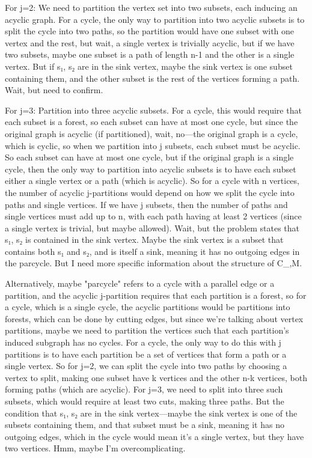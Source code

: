 For j=2: We need to partition the vertex set into two subsets, each inducing an acyclic graph. For a cycle, the only way to partition into two acyclic subsets is to split the cycle into two paths, so the partition would have one subset with one vertex and the rest, but wait, a single vertex is trivially acyclic, but if we have two subsets, maybe one subset is a path of length n-1 and the other is a single vertex. But if {s₁, s₂} are in the sink vertex, maybe the sink vertex is one subset containing them, and the other subset is the rest of the vertices forming a path. Wait, but need to confirm. 

For j=3: Partition into three acyclic subsets. For a cycle, this would require that each subset is a forest, so each subset can have at most one cycle, but since the original graph is acyclic (if partitioned), wait, no—the original graph is a cycle, which is cyclic, so when we partition into j subsets, each subset must be acyclic. So each subset can have at most one cycle, but if the original graph is a single cycle, then the only way to partition into acyclic subsets is to have each subset either a single vertex or a path (which is acyclic). So for a cycle with n vertices, the number of acyclic j-partitions would depend on how we split the cycle into paths and single vertices. If we have j subsets, then the number of paths and single vertices must add up to n, with each path having at least 2 vertices (since a single vertex is trivial, but maybe allowed). Wait, but the problem states that {s₁, s₂} is contained in the sink vertex. Maybe the sink vertex is a subset that contains both s₁ and s₂, and is itself a sink, meaning it has no outgoing edges in the parcycle. But I need more specific information about the structure of C_{,M}. 

Alternatively, maybe "parcycle" refers to a cycle with a parallel edge or a partition, and the acyclic j-partition requires that each partition is a forest, so for a cycle, which is a single cycle, the acyclic partitions would be partitions into forests, which can be done by cutting edges, but since we're talking about vertex partitions, maybe we need to partition the vertices such that each partition's induced subgraph has no cycles. For a cycle, the only way to do this with j partitions is to have each partition be a set of vertices that form a path or a single vertex. So for j=2, we can split the cycle into two paths by choosing a vertex to split, making one subset have k vertices and the other n-k vertices, both forming paths (which are acyclic). For j=3, we need to split into three such subsets, which would require at least two cuts, making three paths. But the condition that {s₁, s₂} are in the sink vertex—maybe the sink vertex is one of the subsets containing them, and that subset must be a sink, meaning it has no outgoing edges, which in the cycle would mean it's a single vertex, but they have two vertices. Hmm, maybe I'm overcomplicating. 

